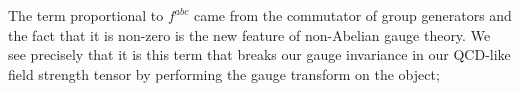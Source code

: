 The term proportional to $f^{abc}$ came from the commutator of group generators and the fact that it is non-zero is the new feature of non-Abelian gauge theory. We see precisely that it is this term that breaks our gauge invariance in our QCD-like field strength tensor by performing the gauge transform on the object;